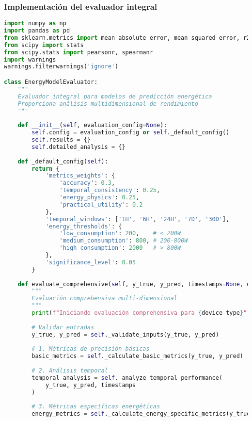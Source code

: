 \subsubsection{Implementación del evaluador integral}

\begin{lstlisting}[language=Python, caption=Framework integral de evaluación]
import numpy as np
import pandas as pd
from sklearn.metrics import mean_absolute_error, mean_squared_error, r2_score
from scipy import stats
from scipy.stats import pearsonr, spearmanr
import warnings
warnings.filterwarnings('ignore')

class EnergyModelEvaluator:
    """
    Evaluador integral para modelos de predicción energética
    Proporciona análisis multidimensional de rendimiento
    """
    
    def __init__(self, evaluation_config=None):
        self.config = evaluation_config or self._default_config()
        self.results = {}
        self.detailed_analysis = {}
        
    def _default_config(self):
        return {
            'metrics_weights': {
                'accuracy': 0.3,
                'temporal_consistency': 0.25,
                'energy_physics': 0.25,
                'practical_utility': 0.2
            },
            'temporal_windows': ['1H', '6H', '24H', '7D', '30D'],
            'energy_thresholds': {
                'low_consumption': 200,    # < 200W
                'medium_consumption': 800, # 200-800W
                'high_consumption': 2000   # > 800W
            },
            'significance_level': 0.05
        }
    
    def evaluate_comprehensive(self, y_true, y_pred, timestamps=None, device_type='aggregate'):
        """
        Evaluación comprehensiva multi-dimensional
        """
        print(f"Iniciando evaluación comprehensiva para {device_type}")
        
        # Validar entradas
        y_true, y_pred = self._validate_inputs(y_true, y_pred)
        
        # 1. Métricas de precisión básicas
        basic_metrics = self._calculate_basic_metrics(y_true, y_pred)
        
        # 2. Análisis temporal
        temporal_analysis = self._analyze_temporal_performance(
            y_true, y_pred, timestamps
        )
        
        # 3. Métricas específicas energéticas
        energy_metrics = self._calculate_energy_specific_metrics(y_true, y_pred)
        

\end{lstlisting}

